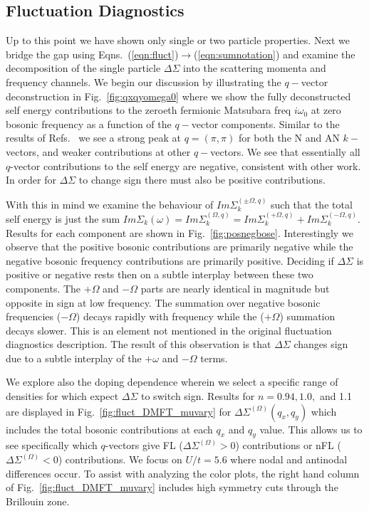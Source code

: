 \documentclass[twocolumn,notitlepage,prb,superscriptaddress,showpacs]{revtex4-1}
\begin{document}
\subsection{Fluctuation Diagnostics}
Up to this point we have shown only single or two particle properties.  Next we bridge the gap using Eqns.~(\ref{eqn:fluct})$\to$(\ref{eqn:sumnotation}) and examine the decomposition of the single particle $\Delta\Sigma$ into the scattering momenta and frequency channels.
We begin our discussion by illustrating  the $q-$vector deconstruction in Fig.~\ref{fig:qxqyomega0} where we show the fully deconstructed self energy contributions to the zeroeth fermionic Matsubara freq $i\omega_0$ at zero bosonic frequency as a function of the $q-$vector components. 
Similar to the results of Refs.~ we see a strong peak at $q=(\pi,\pi)$ for both the N and AN $k-$vectors, and weaker contributions at other $q-$vectors.  
We see that essentially all $q$-vector contributions to the self energy are negative, consistent with other work.\cite{andergassen:2019,gunnarsson:2015}
In order for $\Delta \Sigma$ to change sign there must also be positive contributions.

With this in mind we examine the behaviour of $Im\Sigma_k^{(\pm \Omega,q)}$ such that the total self energy is just the sum $Im\Sigma_k(\omega)=Im\Sigma_k^{(\Omega,q)}= Im\Sigma_k^{(+ \Omega,q)}+Im\Sigma_k^{(- \Omega,q)}$.  Results for each component are shown in Fig.~\ref{fig:posnegbose}.   Interestingly we observe that the positive bosonic contributions are primarily negative while the negative bosonic frequency contributions are primarily positive.   Deciding if $\Delta \Sigma$ is positive or negative rests then on a subtle interplay between these two components.  The $+\Omega$ and $-\Omega$ parts are nearly identical in magnitude but opposite in sign at low frequency.  The summation over negative bosonic frequencies ($-\Omega$) decays rapidly with frequency while the ($+\Omega$) summation decays slower. This is an element not mentioned in the original fluctuation diagnostics description.\cite{gunnarsson:2015} The result of this observation is that $\Delta \Sigma$ changes sign due to a subtle interplay of the $+\omega$ and $-\Omega$ terms.  

We explore also the doping dependence wherein we select a specific range of densities for which expect $\Delta \Sigma$ to switch sign. 
Results for $n=0.94, 1.0,$ and 1.1 are displayed in Fig.~\ref{fig:fluct_DMFT_muvary} for $\Delta \Sigma^{(\Omega)}(q_x,q_y)$ which includes the total bosonic contributions at each $q_x$ and $q_y$ value.  
This allows us to see specifically which $q$-vectors give FL ($\Delta \Sigma^{(\Omega)}>0$) contributions or nFL  ($\Delta \Sigma^{(\Omega)}<0$) contributions.  We focus on $U/t=5.6$ where nodal and antinodal differences occur. 
To assist with analyzing the color plots, the right hand column of Fig.~\ref{fig:fluct_DMFT_muvary} includes high symmetry cuts through the Brillouin zone.
\end{document}
